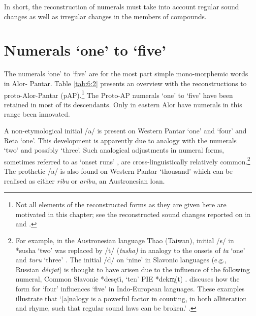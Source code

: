 In short, the reconstruction of numerals must take into account regular sound changes as well as irregular changes in the members of compounds. 

\section{Numerals `one' to `five'}\label{sec:6:4}
The numerals `one' to `five' are for the most part simple mono-morphemic words in Alor- Pantar. Table \ref{tab:6:2} presents an overview with the reconstructions to proto-Alor-Pantar (pAP).\footnote{Not all elements of the reconstructed forms as they are given here are motivated in this chapter; see the reconstructed sound changes reported on in \citet{HoltonEtAl2012} and \citet{HoltonEtAlTV}.}  The Proto-AP numerals `one' to `five' have been retained in most of its descendants. Only in eastern Alor have numerals in this range been innovated. 
 
A non-etymological initial /a/ is present on Western Pantar `one' and `four' and Reta `one'. This development is apparently due to analogy with the numerals `two' and possibly `three'. Such analogical adjustments in numeral forms, sometimes referred to as `onset runs' \citep{Matisoff1995}, are cross-linguistically relatively common.\footnote{For example, in the Austronesian language Thao (Taiwan), initial /s/ in *susha `two' was replaced by /t/ (\textit{tusha)} in analogy to the onsets of \textit{ta} `one' and \textit{turu} `three' \citep[274]{Blust2009}. The initial /d/ on `nine' in Slavonic languages (e.g., Russian \textit{d\'evjat}) is thought to have arisen due to the influence of the following numeral, Common Slavonic *des\k{e}t\u{\i}, `ten' PIE *dekm̥(t) \citep[760]{Comrie1992}. \citet{Winter1969} discuses how the form for `four' influences `five' in Indo-European languages. These examples illustrate that `[a]nalogy is a powerful factor in counting, in both alliteration and rhyme, such that regular sound laws can be broken.' \citep[256]{Sidwell1999}.} The prothetic /a/ is also found on Western Pantar `thousand' which can be realised as either \textit{ribu} or \textit{aribu}, an Austronesian loan. 



